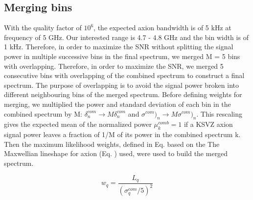 
\subsection{Merging bins}

With the quality factor of $10^6$, the expected axion bandwidth is of 5 kHz at frequency of 5 GHz. Our interested range is 4.7 - 4.8 GHz and the bin width is of 1 kHz. Therefore, in order to maximize the SNR without splitting the signal power in multiple successive bins in the final spectrum, we merged M = 5 bins with overlapping.
Therefore, in order to maximize the SNR, we merged 5 consecutive bins with overlapping of the combined spectrum to construct a final spectrum. The purpose of overlapping is to avoid the signal power broken into different neighbouring bins of the merged spectrum. Before defining weights for merging, we multiplied the power and standard deviation of each bin in the combined spectrum by M: $\delta^{com}_n \rightarrow M\delta^{com}_n$ and $\sigma^{com})_n \rightarrow M \sigma^{com})_n$. This rescaling gives the expected mean of the normalized power $\mu^{comb}_k = 1$ if a KSVZ axion signal power leaves a fraction of 1/M of its power in the combined spectrum k.
Then the maximum likelihood weights, defined in Eq. \cite{eq:merge_weight} based on the The Maxwellian lineshape for axion (Eq. \cite{}) used, were used to build the merged spectrum.


\begin{equation}
    \label{eq:merge_weight}
    w_{q} = \frac{L_{q}}{(\sigma_{q}^{com}/5)^{2}}
\end{equation}


